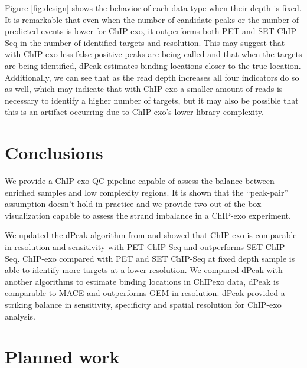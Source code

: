 \documentclass[11pt]{article}\usepackage[]{graphicx}\usepackage[]{color}
\begin{document}
Figure \ref{fig:design} shows the behavior of each data type when
their depth is fixed. It is remarkable that even when the number of
candidate peaks or the number of predicted events is lower for
ChIP-exo, it outperforms both PET and SET ChIP-Seq in the number of
identified targets and resolution. This may suggest that with ChIP-exo
less false positive peaks are being called and that when the targets
are being identified, dPeak estimates binding locations closer to the
true location. Additionally, we can see that as the read depth
increases all four indicators do so as well, which may indicate that
with ChIP-exo a smaller amount of reads is necessary to identify a
higher number of targets, but it may also be possible that this is an
artifact occurring due to ChIP-exo's lower library complexity.


\section{Conclusions}
\label{sec:conclusions}

We provide a ChIP-exo QC pipeline capable of assess the balance between
enriched samples and low complexity regions. It is shown that the
``peak-pair'' assumption doesn't hold in practice and we provide two
out-of-the-box visualization capable to assess the strand imbalance in
a ChIP-exo experiment.

We updated the dPeak algorithm from \cite{dpeak} and showed that
ChIP-exo is comparable in resolution and sensitivity with PET ChIP-Seq
and outperforms SET ChIP-Seq. ChIP-exo compared with PET and SET
ChIP-Seq at fixed depth sample is able to identify more targets at a
lower resolution. We compared dPeak with another algorithms to
estimate binding locations in ChIPexo data, dPeak is comparable to
MACE and outperforms GEM in resolution. dPeak provided a striking
balance in sensitivity, specificity and spatial resolution for
ChIP-exo analysis.


\newpage


\section{Planned work}
\label{sec:future}





\newpage


\nocite{exo_gb}
\nocite{maplot1}
\nocite{maplot2}
\end{document}
